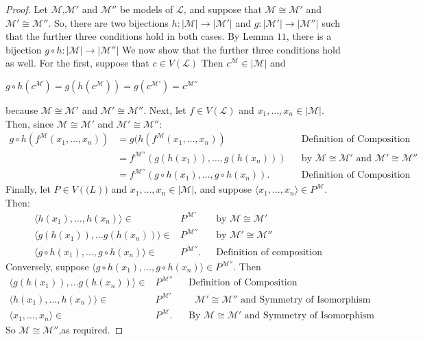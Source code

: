 \documentclass{article}
\begin{document}
\begin{proof} 
Let $\mathcal{M}$,$\mathcal{M'}$ and $\mathcal{M''}$ be models of $\mathscr{L}$, and suppose that $\mathcal{M} \cong \mathcal{M'}$ and $\mathcal{M'} \cong \mathcal{M''}$. So, there are two bijections $h: | \mathcal{M} | \rightarrow | \mathcal{M'} |$ and $g:  | \mathcal{M'} | \rightarrow | \mathcal{M''}|$ such that the further three conditions hold in both cases. By Lemma $11$, there is a bijection  $g \circ h:  | \mathcal{M}| \rightarrow  | \mathcal{M''}|$ We now show that the further three conditions hold as well. For the first, suppose that $c \in V(\mathscr{L})$ Then $c^\mathcal{M} \in |\mathcal{M}|$ and \begin{center}  $g\circ h(c^\mathcal{M}) = g(h(c^\mathcal{M})) = g(c^\mathcal{M'}) = c^\mathcal{M''}$ \end{center} because 
$\mathcal{M} \cong \mathcal{M'}$ and $\mathcal{M'} \cong \mathcal{M''}$. Next, let $f \in V(\mathscr{L})$ and $x_1, \ldots, x_n \in |\mathcal{M}|$. Then, since $\mathcal{M} \cong \mathcal{M'}$ and $\mathcal{M'} \cong \mathcal{M''}$: 
\begin{align*}
g \circ h(f^\mathcal{M}(x_1, \ldots, x_n)) &= g(h(f^\mathcal{M}(x_1, \ldots, x_n))&&\text{Definition of Composition}\\
&= f^\mathcal{M''}(g(h(x_1)), \ldots,g(h(x_n)))&&\text{by $\mathcal{M} \cong \mathcal{M'}$ and $\mathcal{M'} \cong \mathcal{M''}$}\\
&=  f^\mathcal{M''}(g\circ h(x_1), \ldots,g \circ h(x_n)).&&\text{Definition of Composition}
\end{align*}
Finally, let $P \in V(\mathscr(L))$ and $x_1, \ldots, x_n \in |\mathcal{M}|$, and suppose $\langle x_1, \ldots, x_n \rangle \in P^\mathcal{M}$. Then: 
\begin{align*}
\langle h(x_1), \ldots, h(x_n) \rangle \in &P^\mathcal{M'}&&\text{by $\mathcal{M} \cong \mathcal{M'}$}\\
\langle g(h(x_1)), \ldots g(h(x_n)) \rangle \in &P^\mathcal{M''}&&\text{by  $\mathcal{M'} \cong \mathcal{M''}$}\\
\langle g \circ h(x_1), \ldots, g \circ h(x_n) \rangle \in &P^\mathcal{M''}.&&\text{Definition of composition}
\end{align*}
Conversely, suppose $\langle g \circ h(x_1), \ldots, g \circ h(x_n) \rangle \in P^\mathcal{M''}$. Then 
\begin{align*} 
\langle g(h(x_1)), \ldots g(h(x_n)) \rangle \in &P^\mathcal{M''}&&\text{Definition of Composition}\\
\langle h(x_1), \ldots, h(x_n) \rangle \in &P^\mathcal{M'}&&\text{ $\mathcal{M'} \cong \mathcal{M''}$ and Symmetry of Isomorphism}\\
\langle x_1, \ldots, x_n \rangle \in &P^\mathcal{M}.&&\text{By $\mathcal{M} \cong \mathcal{M'}$ and Symmetry of Isomorphism}
\end{align*}
So $\mathcal{M} \cong \mathcal{M''}$,as required. 
\end{proof}
\end{document}
